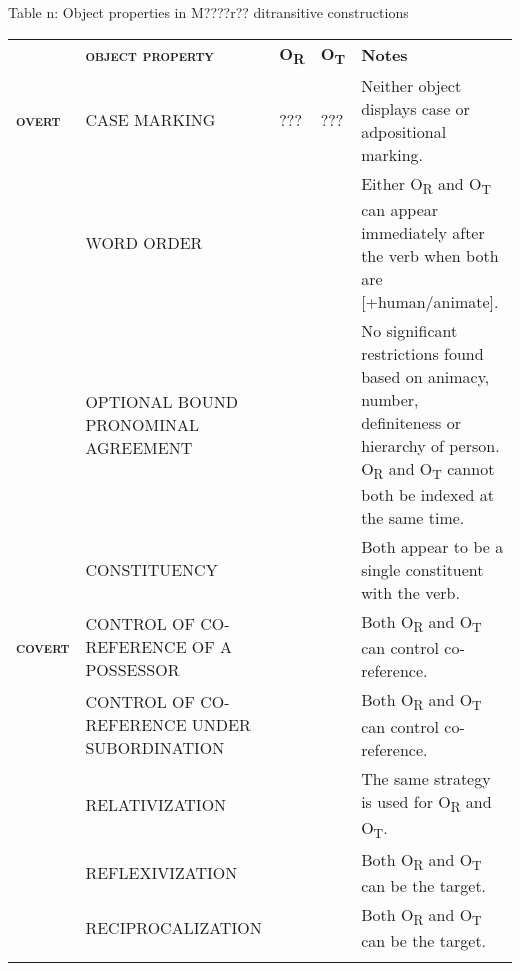 \documentclass[output=paper]{langsci/langscibook}
\begin{document}
\begin{table}\caption{
\label{bkm:Ref444780947}Table n: Object properties in M????r?? ditransitive constructions
}\end{table}

\begin{tabularx}{\textwidth}{XXXXX} & \textbf{\textsc{object property}} & \textbf{O}\textbf{\textsubscript{R}} & \textbf{O}\textbf{\textsubscript{T}} & \textbf{Notes}\\
\lsptoprule
{ \textbf{\textsc{overt}}} & CASE MARKING & ??? & ??? & Neither object displays case or adpositional marking.\\
& WORD ORDER & 

 & 

 & Either O\textsubscript{R} and O\textsubscript{T} can appear immediately after the verb when both are [+human/animate]. \\
\hhline{~----} & OPTIONAL BOUND PRONOMINAL AGREEMENT & 

 & 

 & No significant restrictions found based on animacy, number, definiteness or hierarchy of person. O\textsubscript{R} and O\textsubscript{T} cannot both be indexed at the same time.\\
\hhline{~----} & CONSTITUENCY & 

 & 

 & Both appear to be a single constituent with the verb.\\
{ \textbf{\textsc{covert}}} & CONTROL OF CO-REFERENCE OF A POSSESSOR & 

 & 

 & Both O\textsubscript{R }and O\textsubscript{T} can control co-reference.\\
& CONTROL OF CO-REFERENCE UNDER SUBORDINATION & 

 & 

 & Both O\textsubscript{R }and O\textsubscript{T} can control co-reference.\\
\hhline{~----} & RELATIVIZATION & 

 & 

 & The same strategy is used for O\textsubscript{R} and O\textsubscript{T}.\\
\hhline{~----} & REFLEXIVIZATION & 

 & 

 & Both O\textsubscript{R }and O\textsubscript{T }can be the target.\\
\hhline{~----} & RECIPROCALIZATION & 

 & 

 & Both O\textsubscript{R }and O\textsubscript{T }can be the target.\\
\hhline{~----}
\lspbottomrule
\end{tabularx}
\end{document}
